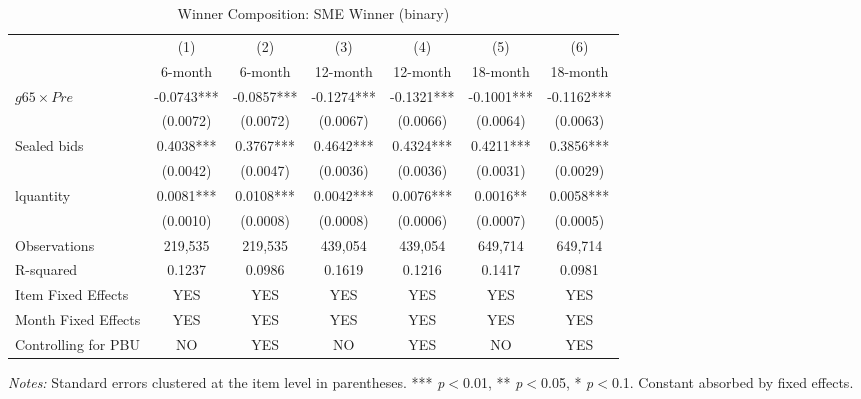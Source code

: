 \begin{table}[htbp]
\centering
\caption{Winner Composition: SME Winner (binary)}
\label{tab:sme_winner}
\begin{adjustbox}{max width=\textwidth}
\begin{threeparttable}
\small
\begin{tabular}{lcccccc}
\toprule
 & (1) & (2) & (3) & (4) & (5) & (6) \\
 & 6-month & 6-month & 12-month & 12-month & 18-month & 18-month \\
\midrule
$g65 \times Pre$ & -0.0743*** & -0.0857*** & -0.1274*** & -0.1321*** & -0.1001*** & -0.1162*** \\
 & (0.0072) & (0.0072) & (0.0067) & (0.0066) & (0.0064) & (0.0063) \\
Sealed bids & 0.4038*** & 0.3767*** & 0.4642*** & 0.4324*** & 0.4211*** & 0.3856*** \\
 & (0.0042) & (0.0047) & (0.0036) & (0.0036) & (0.0031) & (0.0029) \\
lquantity & 0.0081*** & 0.0108*** & 0.0042*** & 0.0076*** & 0.0016** & 0.0058*** \\
 & (0.0010) & (0.0008) & (0.0008) & (0.0006) & (0.0007) & (0.0005) \\
\midrule
Observations & 219,535 & 219,535 & 439,054 & 439,054 & 649,714 & 649,714 \\
R-squared & 0.1237 & 0.0986 & 0.1619 & 0.1216 & 0.1417 & 0.0981 \\
Item Fixed Effects & YES & YES & YES & YES & YES & YES \\
Month Fixed Effects & YES & YES & YES & YES & YES & YES \\
Controlling for PBU & NO & YES & NO & YES & NO & YES \\
\bottomrule
\end{tabular}
\begin{tablenotes}
\small
\item \textit{Notes:} Standard errors clustered at the item level in parentheses.
*** \textit{p}$<$0.01, ** \textit{p}$<$0.05, * \textit{p}$<$0.1.
Constant absorbed by fixed effects.
\end{tablenotes}
\end{threeparttable}
\end{adjustbox}
\end{table}
